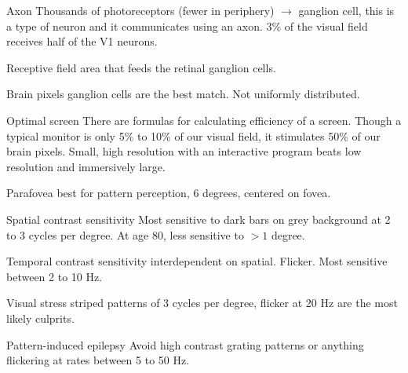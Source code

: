 \begin{mdframed}
\begin{multicols}{2}
\begin{compactdesc}
\item[Axon] Thousands of photoreceptors (fewer in periphery) $\to$ ganglion
    cell, this is a type of neuron and it communicates using an axon. 3\% of
    the visual field receives half of the V1 neurons.
\item[Receptive field] area that feeds the retinal ganglion cells.
\item[Brain pixels] ganglion cells are the best match. Not uniformly
    distributed.
\item[Optimal screen]
    There are formulas for calculating efficiency of a
    screen. Though a typical monitor is only 5\% to 10\% of our visual field,
    it stimulates 50\% of our brain pixels. Small, high resolution with an
    interactive program beats low resolution and immersively large.
\item[Parafovea] best for pattern perception, 6 degrees, centered on fovea.
\item[Spatial contrast sensitivity] Most sensitive to dark bars on
    grey background at 2 to 3 cycles per degree. At age 80, less sensitive to
    $>1$ degree.
\item[Temporal contrast sensitivity] interdependent on spatial. Flicker. Most
    sensitive between 2 to 10 Hz.
\item[Visual stress] striped patterns of 3 cycles per degree, flicker at 20 Hz
    are the most likely culprits.
\item[Pattern-induced epilepsy] Avoid high contrast grating patterns or
    anything flickering at rates between 5 to 50 Hz.
\end{compactdesc}
\end{multicols}\end{mdframed}









